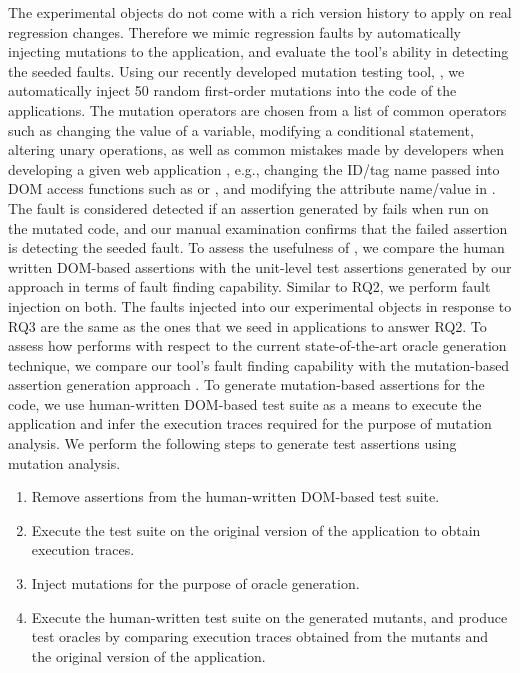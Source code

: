 The experimental objects do not come with a rich version history to apply \tool on real regression changes. Therefore we mimic regression faults by automatically injecting mutations to the application, and evaluate the tool's ability in detecting the seeded faults. Using our recently developed mutation testing tool, \mutandis \cite{mirshokraie:icst13}, we automatically inject 50 random first-order mutations into the \javascript code of the applications. The mutation operators are chosen from a list of common operators such as changing the value of a variable, modifying a conditional statement, altering unary operations, as well as common mistakes made by developers when developing a given web application \cite{mirshokraie:tse15}, e.g., changing the ID/tag name passed into DOM access functions such as  or , and modifying the attribute name/value in . The fault is considered detected if an assertion generated by \tool fails when run on the mutated code, and our manual examination confirms that the failed assertion is detecting the seeded fault.
 To assess the usefulness of \tool, we compare the human written DOM-based assertions with the unit-level test assertions generated by our approach in terms of fault finding capability.
Similar to RQ2, we perform fault injection on both.
The faults injected into our experimental objects in response to RQ3 are the same as the ones that we seed in applications to answer RQ2.
 To assess how \tool performs with respect to the current state-of-the-art oracle generation technique, we compare our tool's fault finding capability with the mutation-based assertion generation approach \cite{mirshokraie:icst15, fraser:tse12}. To generate mutation-based assertions for the \javascript code, we use human-written DOM-based test suite as a means to execute the application and infer the execution traces required for the purpose of mutation analysis. We perform the following steps to generate test assertions using mutation analysis.
\begin{enumerate}
\item Remove assertions from the human-written DOM-based test suite.
\item Execute the test suite on the original version of the application to obtain execution traces.
\item Inject mutations for the purpose of oracle generation.
\item Execute the human-written test suite on the generated mutants, and produce test oracles by comparing execution traces obtained from the mutants and the original version of the application.
\end{enumerate}
